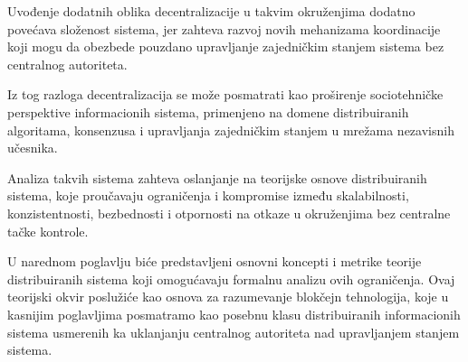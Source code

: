 Uvođenje dodatnih oblika decentralizacije u takvim okruženjima dodatno povećava složenost sistema, jer zahteva razvoj novih mehanizama koordinacije koji mogu da obezbede pouzdano upravljanje zajedničkim stanjem sistema bez centralnog autoriteta.

Iz tog razloga decentralizacija se može posmatrati kao proširenje sociotehničke perspektive informacionih sistema, primenjeno na domene distribuiranih algoritama, konsenzusa i upravljanja zajedničkim stanjem u mrežama nezavisnih učesnika.

Analiza takvih sistema zahteva oslanjanje na teorijske osnove distribuiranih sistema, koje proučavaju ograničenja i kompromise između skalabilnosti, konzistentnosti, bezbednosti i otpornosti na otkaze u okruženjima bez centralne tačke kontrole.

U narednom poglavlju biće predstavljeni osnovni koncepti i metrike teorije distribuiranih sistema koji omogućavaju formalnu analizu ovih ograničenja. Ovaj teorijski okvir poslužiće kao osnova za razumevanje blokčejn tehnologija, koje u kasnijim poglavljima posmatramo kao posebnu klasu distribuiranih informacionih sistema usmerenih ka uklanjanju centralnog autoriteta nad upravljanjem stanjem sistema.